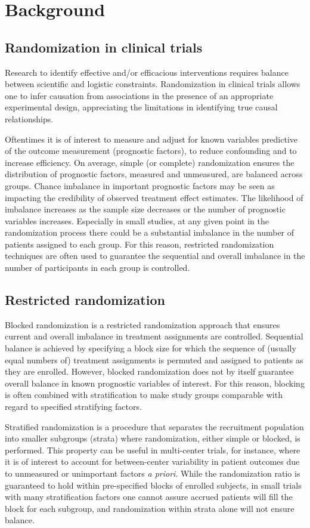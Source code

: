 \chapter{Background}
\section[Randomization in RCTs]{Randomization in clinical trials}
Research to identify effective and/or efficacious interventions requires balance between scientific and logistic constraints. 
Randomization in clinical trials allows one to infer causation from associations in the presence of an appropriate experimental design, appreciating the limitations in identifying true causal relationships. 

Oftentimes it is of interest to measure and adjust for known variables predictive of the outcome measurement (prognostic factors), to reduce confounding and to increase efficiency.  
On average, simple (or complete) randomization ensures the distribution of prognostic factors, measured and unmeasured, are balanced across groups.  
Chance imbalance in important prognostic factors may be seen as impacting the credibility of observed treatment effect estimates.  
The likelihood of imbalance increases as the sample size decreases or the number of prognostic variables increases.  
Especially in small studies, at any given point in the randomization process there could be a substantial imbalance in the number of patients assigned to each group.  
For this reason, restricted randomization techniques are often used to guarantee the sequential and overall imbalance in the number of participants in each group is controlled.


\section{Restricted randomization}
Blocked randomization is a restricted randomization approach that ensures current and overall imbalance in treatment assignments are controlled.  
Sequential balance is achieved by specifying a block size for which the sequence of (usually equal numbers of) treatment assignments is permuted and assigned to patients as they are enrolled. 
However, blocked randomization does not by itself guarantee overall balance in known prognostic variables of interest.  
For this reason, blocking is often combined with stratification to make study groups comparable with regard to specified stratifying factors.  

Stratified randomization is a procedure that separates the recruitment population into smaller subgroups (strata) where randomization, either simple or blocked, is performed.  
This property can be useful in multi-center trials, for instance, where it is of interest to account for between-center variability in patient outcomes due to unmeasured or unimportant factors \textit{a priori}. 
While the randomization ratio is guaranteed to hold within pre-specified blocks of enrolled subjects, in small trials with many stratification factors one cannot assure accrued patients will fill the block for each subgroup, and randomization within strata alone will not ensure balance.  

